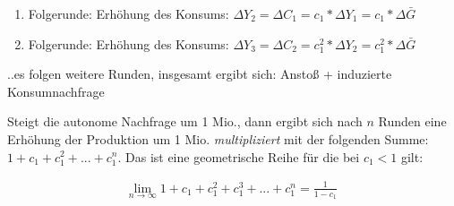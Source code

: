 \documentclass[11pt]{article}
\begin{document}
\begin{enumerate}
\item Folgerunde: Erhöhung des Konsums: \(\Delta Y_2 = \Delta C_1 = c_1 * \Delta Y_1 = c_1*\Delta \bar{G}\)

\item Folgerunde: Erhöhung des Konsums: \(\Delta Y_3 = \Delta C_2 = c_{1}^{2} * \Delta Y_2 = c_{1}^{2} *\Delta \bar{G}\)
\end{enumerate}

..es folgen weitere Runden, insgesamt ergibt sich: Anstoß + induzierte Konsumnachfrage

Steigt die autonome Nachfrage um 1 Mio., dann ergibt sich nach \(n\) Runden eine Erhöhung der Produktion um 1 Mio. \emph{multipliziert} mit der folgenden Summe: \(1+ c_1 + c_{1}^{2} + ... + c_{1}^{n}\). Das ist eine geometrische Reihe für die bei \(c_1<1\) gilt:

\begin{equation*}
\begin{aligned}
\lim\limits_{n \to \infty}1+ c_1 + c_{1}^{2} + c_{1}^{3} + ... + c_{1}^{n} = \frac{1}{1-c_1}\
\end{aligned}
\end{equation*}
\end{document}
